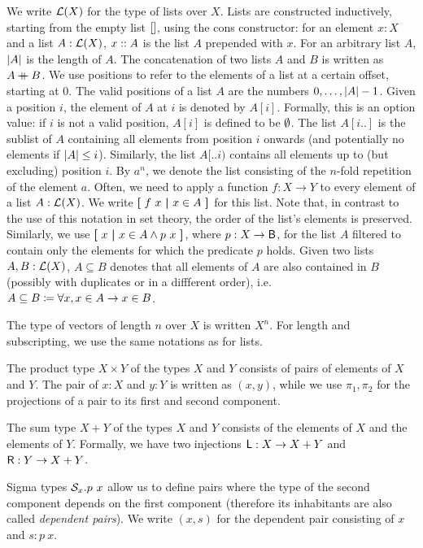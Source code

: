 We write $\mathcal{L} (X)$ for the type of lists over $X$. Lists are constructed inductively, starting from the empty list $[]$, using the cons constructor: for an element $x : X$ and a list $A : \mathcal{L} (X)$, $x::{} A$ is the list $A$ prepended with $x$.
For an arbitrary list $A$, $|A|$ is the length of $A$. 
The concatenation of two lists $A$ and $B$ is written as $A \mathbin{+\mkern-10mu+}{} B$. 
We use positions to refer to the elements of a list at a certain offset, starting at 0. The valid positions of a list $A$ are the numbers $0, \ldots, |A|-1$. 
Given a position $i$, the element of $A$ at $i$ is denoted by $A[i]$. Formally, this is an option value: if $i$ is not a valid position, $A[i]$ is defined to be $\emptyset{}$. 
The list $A[i..]$ is the sublist of $A$ containing all elements from position $i$ onwards (and potentially no elements if $|A| \le i$). Similarly, the list $A[..i)$ contains all elements up to (but excluding) position $i$. 
By $a^n$, we denote the list consisting of the $n$-fold repetition of the element $a$.
Often, we need to apply a function $f : X \rightarrow Y$ to every element of a list $A : \mathcal{L} (X)$. We write $\textbf{[}~ f~x ~\textbf{|}~ x \in A ~\textbf{]}$ for this list. Note that, in contrast to the use of this notation in set theory, the order of the list's elements is preserved. 
Similarly, we use $\textbf{[}~ x ~\textbf{|}~ x \in A \land p~x ~\textbf{]}$, where $p : X \rightarrow \textsf{B}$, for the list $A$ filtered to contain only the elements for which the predicate $p$ holds.
Given two lists $A, B : \mathcal{L} (X)$, $A \subseteq B$ denotes that all elements of $A$ are also contained in $B$ (possibly with duplicates or in a diffferent order), i.e.\ $A \subseteq B \coloneqq \forall x, x \in A \rightarrow x \in B$. 

The type of vectors of length $n$ over $X$ is written $X^n$. For length and subscripting, we use the same notations as for lists.

The product type $X \times Y$ of the types $X$ and $Y$ consists of pairs of elements of $X$ and $Y$. The pair of $x : X$ and $y : Y$ is written as $(x, y)$, while we use $\pi_1, \pi_2$ for the projections of a pair to its first and second component. 

The sum type $X + Y$ of the types $X$ and $Y$ consists of the elements of $X$ and the elements of $Y$. Formally, we have two injections $\textsf{L} : X \rightarrow X + Y$ and $\textsf{R} : Y \rightarrow X + Y$. 

Sigma types $\mathcal{S}_{x}.p~x$ allow us to define pairs where the type of the second component depends on the first component (therefore its inhabitants are also called \emph{dependent pairs}). We write $(x, s)$ for the dependent pair consisting of $x$ and $s : p~x$. 

